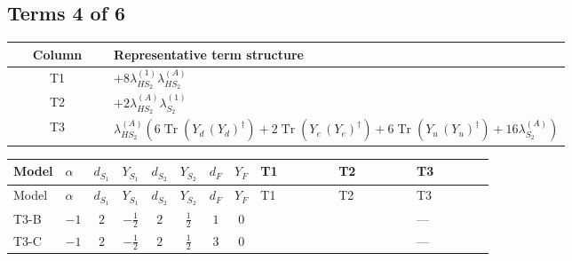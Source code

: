 \documentclass[8pt]{article}
\begin{document}
\begin{landscape}
\subsection*{Terms 4 of 6}
\begin{center}
\begin{tabular}{@{}c >{\raggedright\arraybackslash}p{0.82\linewidth}@{}}
\toprule
Column & Representative term structure \\
\midrule
T1 & \(\displaystyle +8 {\lambda_{HS_2}^{(1)}} {\lambda_{HS_2}^{(A)}}\) \\
\midrule
T2 & \(\displaystyle +2 {\lambda_{HS_2}^{(A)}} {\lambda_{S_2}^{(1)}}\) \\
\midrule
T3 & \(\displaystyle {\lambda_{HS_2}^{(A)}} (6 \operatorname{Tr}\!\left({Y_d}\,\left({Y_d}\right)^{\dagger}\right)+2 \operatorname{Tr}\!\left({Y_e}\,\left({Y_e}\right)^{\dagger}\right)+6 \operatorname{Tr}\!\left({Y_u}\,\left({Y_u}\right)^{\dagger}\right)+16 {\lambda_{S_2}^{(A)}})\) \\
\midrule
\bottomrule
\end{tabular}
\end{center}
\smallskip
\tiny
\begin{longtable}{@{}llcccccc >{\raggedright\arraybackslash}p{0.21\linewidth} >{\raggedright\arraybackslash}p{0.21\linewidth} >{\raggedright\arraybackslash}p{0.21\linewidth}@{}}
\toprule
Model & $\alpha$ & $d_{S_1}$ & $Y_{S_1}$ & $d_{S_2}$ & $Y_{S_2}$ & $d_F$ & $Y_F$ & T1 & T2 & T3 \\
\midrule
\endfirsthead
\toprule
Model & $\alpha$ & $d_{S_1}$ & $Y_{S_1}$ & $d_{S_2}$ & $Y_{S_2}$ & $d_F$ & $Y_F$ & T1 & T2 & T3 \\
\midrule
\endhead
T3-B & $-1$ & $2$ & $-\frac{1}{2}$ & $2$ & $\frac{1}{2}$ & $1$ & $0$ & \scriptsize\adjustbox{max width=\linewidth}{$\begin{gathered} +8 {\lambda_{HS_2}^{(1)}} {\lambda_{HS_2}^{(A)}}\end{gathered}$} & \scriptsize\adjustbox{max width=\linewidth}{$\begin{gathered} +2 {\lambda_{HS_2}^{(A)}} {\lambda_{S_2}^{(1)}}\end{gathered}$} & --- \\
\midrule
T3-C & $-1$ & $2$ & $-\frac{1}{2}$ & $2$ & $\frac{1}{2}$ & $3$ & $0$ & \scriptsize\adjustbox{max width=\linewidth}{$\begin{gathered} +8 {\lambda_{HS_2}^{(1)}} {\lambda_{HS_2}^{(A)}}\end{gathered}$} & \scriptsize\adjustbox{max width=\linewidth}{$\begin{gathered} +2 {\lambda_{HS_2}^{(A)}} {\lambda_{S_2}^{(1)}}\end{gathered}$} & --- \\

\end{longtable}
\end{landscape}
\end{document}
